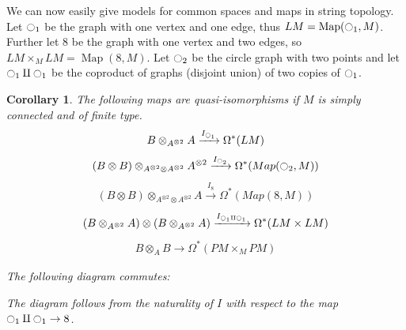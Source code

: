 \documentclass{scrartcl}
\theoremstyle{plain}
\newtheorem{corollary}[theorem]{Corollary}
\theoremstyle{definition}
\let\xto\xrightarrow
\DeclareMathOperator{\Map}{Map}
\renewcommand{\coprod}{\mathbin{\amalg}}
\begin{document}
We can now easily give models for common spaces and maps in string topology. Let $\ocircle_1$ be the graph with one vertex and one edge, thus $LM = \Map(\ocircle_1, M)$. Further let $8$ be the graph with one vertex and two edges, so $LM\times_M LM = \Map(8, M)$. Let $\ocircle_2$ be the circle graph with two points and let $\ocircle_1\coprod \ocircle_1$ be the coproduct of graphs (disjoint union) of two copies of $\ocircle_1$.
\begin{corollary}\label{lem:model-quasi-iso-examples}
    The following maps are quasi-isomorphisms if $M$ is simply connected and of finite type.
    \begin{align*}
        B\otimes_{A^{\otimes 2}} A \xto{I_{\ocircle_1}} \Omega^*(LM)
    \end{align*}
    \begin{align*}
        (B\otimes B)\otimes_{A^{\otimes 2}\otimes A^{\otimes 2}} A^{\otimes 2} \xto{I_{\ocircle_2}}\Omega^*(Map(\ocircle_2, M))
    \end{align*}
    \begin{align*}
        (B\otimes B)\otimes_{A^{\otimes 2}\otimes A^{\otimes 2}} A \xto{I_{8}} \Omega^*(Map(8, M))
    \end{align*}
    \begin{align*}
        (B\otimes_{A^{\otimes 2}}A) \otimes (B\otimes_{A^{\otimes 2}} A) \xto{I_{\ocircle_1\coprod\ocircle_1}} \Omega^*(LM\times LM)
    \end{align*}
    \begin{align*}
        B\otimes_A B\to \Omega^*(PM\times_M PM)
    \end{align*}

    The following diagram commutes:
    \begin{center}
    \end{center}The diagram follows from the naturality of $I$ with respect to the map $\ocircle_1\coprod \ocircle_1\to 8$.
\end{corollary}
\end{document}
